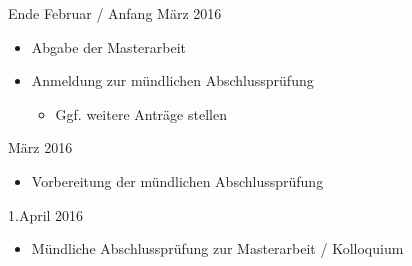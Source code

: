 \documentclass[paper=a4, pagesize, DIV=calc, BCOR=12.5mm, twoside=on, onecolumn=on, open = any, titlepage =on, parskip =half-, headsepline = on, footsepline = on, chapterprefix = on, appendixprefix = off, fontsize = 12pt, numbers = noenddot, abstract = on]{scrbook}
\numberwithin{equation}{chapter}
\begin{document}
Ende Februar / Anfang März 2016
\begin{itemize}
\item Abgabe der Masterarbeit
\item Anmeldung zur mündlichen Abschlussprüfung
\begin{itemize}
\item Ggf. weitere Anträge stellen
\end{itemize}
\end{itemize}

März 2016
\begin{itemize}
\item Vorbereitung der mündlichen Abschlussprüfung
\end{itemize}

1.April 2016
\begin{itemize}
\item Mündliche Abschlussprüfung zur Masterarbeit / Kolloquium
\end{itemize}



\end{document}
